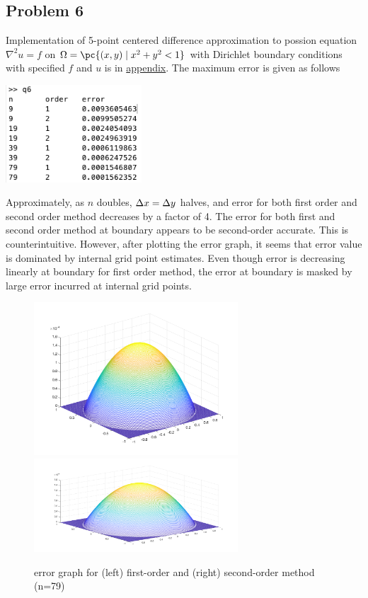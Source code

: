 \documentclass[11pt]{article}
\begin{document}
\subsection*{Problem 6}
Implementation of 5-point centered difference approximation to possion equation $\nabla^2 u = f$ on $\Omega = \pc{(x,y)\mid x^2+y^2<1}$ with Dirichlet boundary conditions with specified $f$ and $u$ is in \hyperref[q6code]{appendix}. The maximum error is given as follows
\begin{center}
    \includegraphics[width=2in]{q6output}
\end{center}
Approximately, as $n$ doubles, $\Delta x=\Delta y$ halves, and error for both first order and second order method decreases by a factor of 4. The error for both first and second order method at boundary appears to be second-order accurate. This is counterintuitive. However, after plotting the error graph, it seems that error value is dominated by internal grid point estimates. Even though error is decreasing linearly at boundary for first order method, the error at boundary is masked by large error incurred at internal grid points. 
\begin{figure}[ht]
    \begin{center} 
        \includegraphics[width=3in]{q6_od_1} 
        \includegraphics[width=3in]{q6_od_2}
        \caption{error graph for (left) first-order and (right) second-order method (n=79)}
    \end{center}
\end{figure}
\end{document}

